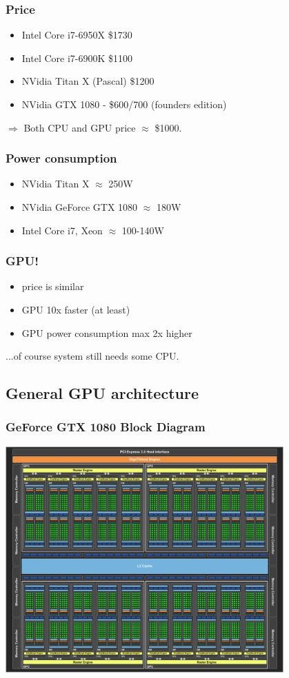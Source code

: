 \documentclass{beamer}
\begin{document}
            \begin{frame}
				\frametitle{Price}
					\begin{itemize}
						\item Intel Core i7-6950X \$1730
						\item Intel Core i7-6900K \$1100
						\item NVidia Titan X (Pascal) \$1200
						\item NVidia GTX 1080 - \$600/700 (founders edition)		
					\end{itemize}
				 \vspace{\baselineskip}
				$\Rightarrow$ Both CPU and GPU price $\approx$ \$1000.
			\end{frame}
            
			\begin{frame}
				\frametitle{Power consumption}
				\begin{itemize}
					\item NVidia Titan X $\approx$ 250W
					\item NVidia GeForce GTX 1080 $\approx$ 180W
					\item Intel Core i7, Xeon $\approx$ 100-140W
				\end{itemize}
			\end{frame}
			
			\begin{frame}
				\frametitle{GPU!}
				\begin{itemize}
					\item price is similar
					\item GPU 10x faster (at least)
					\item GPU power consumption max 2x higher
				\end{itemize}	
				\vspace{\baselineskip}
				...of course system still needs some CPU.
			\end{frame}

		\subsection{General GPU architecture}
        
			\begin{frame}
				\frametitle{GeForce GTX 1080 Block Diagram}
				\includegraphics[width=0.8\textwidth]{GeForce_GTX_1080_Block_Diagram_FINAL.png}
			\end{frame}
            
\end{document}
